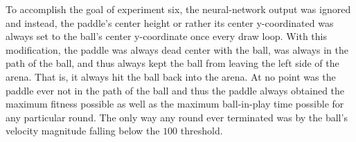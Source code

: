 \documentclass[a4paper,10pt]{article}
\begin{document}
To accomplish the goal of experiment six, the neural-network output was ignored and instead, the paddle's center height or rather its center y-coordinated was always set to the ball's center y-coordinate once every draw loop. With this modification, the paddle was always dead center with the ball, was always in the path of the ball, and thus always kept the ball from leaving the left side of the arena. That is, it always hit the ball back into the arena. At no point was the paddle ever not in the path of the ball and thus the paddle always obtained the maximum fitness possible as well as the maximum ball-in-play time possible for any particular round. The only way any round ever terminated was by the ball's velocity magnitude falling below the $100$ threshold.  

\end{document}
